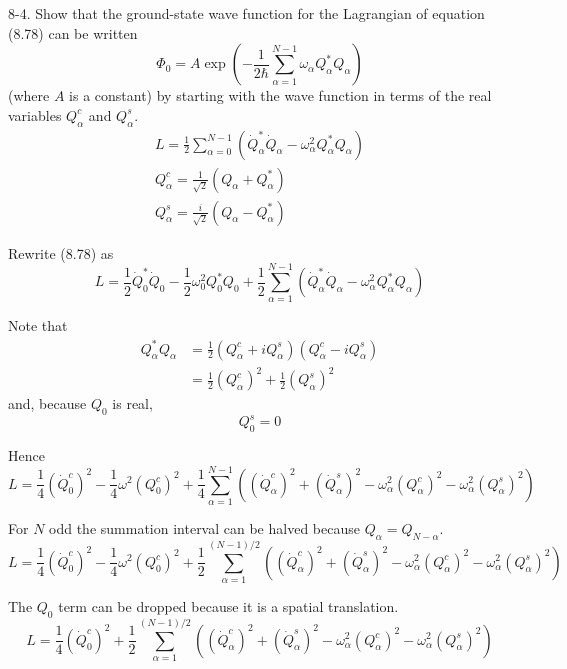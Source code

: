 \documentclass[12pt]{article}
\begin{document}
8-4.
Show that the ground-state wave function for the Lagrangian of
equation (8.78) can be written
\begin{equation*}
\Phi_0=A\exp\left(
-\frac{1}{2\hbar}
\sum_{\alpha=1}^{N-1}
\omega_\alpha Q_\alpha^*Q_\alpha
\right)
\tag{8.83}
\end{equation*}
(where $A$ is a constant) by starting with the wave function in terms of
the real variables $Q_\alpha^c$ and $Q_\alpha^s$.
\begin{gather*}
L=\frac{1}{2}\sum_{\alpha=0}^{N-1}
\left(\dot Q_\alpha^*\dot Q_\alpha-\omega_\alpha^2Q_\alpha^*Q_\alpha\right)
\tag{8.78}
\\
Q_\alpha^c=\frac{1}{\sqrt2}(Q_\alpha+Q_\alpha^*)
\tag{8.79}
\\
Q_\alpha^s=\frac{i}{\sqrt2}(Q_\alpha-Q_\alpha^*)
\tag{8.80}
\end{gather*}

Rewrite (8.78) as
\begin{equation*}
L=\frac{1}{2}\dot Q_0^*\dot Q_0
-\frac{1}{2}\omega_0^2Q_0^*Q_0
+\frac{1}{2}\sum_{\alpha=1}^{N-1}
\left(\dot Q_\alpha^*\dot Q_\alpha-\omega_\alpha^2Q_\alpha^*Q_\alpha\right)
\end{equation*}

Note that
\begin{align*}
Q_\alpha^*Q_\alpha
&=\frac{1}{2}(Q_\alpha^c+iQ_\alpha^s)(Q_\alpha^c-iQ_\alpha^s)
\\
&=\frac{1}{2}(Q_\alpha^c)^2+\frac{1}{2}(Q_\alpha^s)^2
\end{align*}
and, because $Q_0$ is real,
\begin{equation*}
Q_0^s=0
\end{equation*}

Hence
\begin{equation*}
L=\frac{1}{4}(\dot Q_0^c)^2-\frac{1}{4}\omega^2(Q_0^c)^2
+\frac{1}{4}\sum_{\alpha=1}^{N-1}
\left(
(\dot Q_\alpha^c)^2
+(\dot Q_\alpha^s)^2
-\omega_\alpha^2(Q_\alpha^c)^2
-\omega_\alpha^2(Q_\alpha^s)^2
\right)
\end{equation*}

For $N$ odd the summation interval can be halved because $Q_\alpha=Q_{N-\alpha}$.
\begin{equation*}
L=\frac{1}{4}(\dot Q_0^c)^2
-\frac{1}{4}\omega^2(Q_0^c)^2
+\frac{1}{2}\sum_{\alpha=1}^{(N-1)/2}
\left(
(\dot Q_\alpha^c)^2
+(\dot Q_\alpha^s)^2
-\omega_\alpha^2(Q_\alpha^c)^2
-\omega_\alpha^2(Q_\alpha^s)^2
\right)
\end{equation*}

The $Q_0$ term can be dropped because it is a spatial translation.
\begin{equation*}
L=\frac{1}{4}(\dot Q_0^c)^2
+\frac{1}{2}\sum_{\alpha=1}^{(N-1)/2}
\left(
(\dot Q_\alpha^c)^2
+(\dot Q_\alpha^s)^2
-\omega_\alpha^2(Q_\alpha^c)^2
-\omega_\alpha^2(Q_\alpha^s)^2
\right)
\end{equation*}

\end{document}
